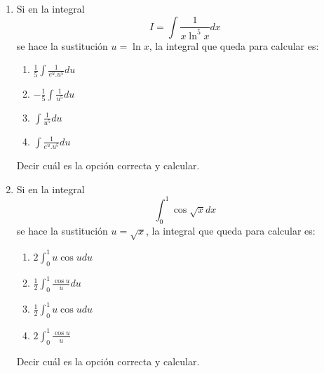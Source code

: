 \documentclass[12pt]{article}
\theoremstyle{definition}
\begin{document}
\begin{enumerate}
\item  
Si en la integral
\begin{equation*}
I =\int \frac{1}{x\ln^5x}dx
\end{equation*} 
se hace la sustitución $u = \ln x$, la integral que queda para calcular es:
\begin{enumerate}
\item $\frac{1}{5}\int \frac{1}{e^u.u^5}du$ 
\item $-\frac{1}{5}\int \frac{1}{u^5}du$ 
\item $\int \frac{1}{u^5}du$
\item $\int \frac{1}{e^u.u^5}du$
 \end{enumerate}
Decir cuál es la opción correcta y calcular.

\item  
Si en la integral
\begin{equation*}
\int_{0}^{1} \cos{\sqrt{x}}dx
\end{equation*} 
se hace la sustitución $u = \sqrt{x}$, la integral que queda para calcular es:
\begin{enumerate}
\item $2\int_{0}^{1} u\cos u du$ 
\item $\frac{1}{2}\int_{0}^{1} \frac{\cos u }{u} du$
\item $\frac{1}{2}\int_{0}^{1} u\cos u du$
\item $2 \int_{0}^{1} \frac{\cos u }{u} $
 \end{enumerate}
Decir cuál es la opción correcta y calcular.

\end{enumerate}
\end{document}

